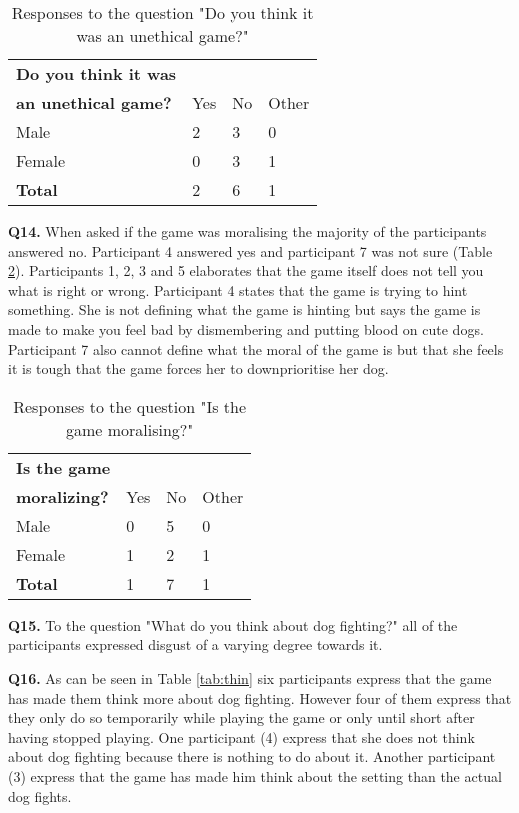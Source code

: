 \begin{table}[h]
\centering
\begin{tabular}{l l l l}
\hline
\textbf{Do you think it was}\\
\textbf{an unethical game?} & Yes & No & Other \\
\hline
Male & 2 & 3 & 0 \\
Female & 0 & 3 & 1 \\
\textbf{Total} & 2 & 6 & 1 \\
\hline
\end{tabular}
\caption{\label{tab:ethi}Responses to the question "Do you think it was an unethical game?"}
\end{table}


\textbf{Q14.} When asked if the game was moralising the majority of the participants answered no. Participant 4 answered yes and participant 7 was not sure (Table \ref{tab:mora}). Participants 1, 2, 3 and 5 elaborates that the game itself does not tell you what is right or wrong. Participant 4 states that the game is trying to hint something. She is not defining what the game is hinting but says the game is made to make you feel bad by dismembering and putting blood on cute dogs. Participant 7 also cannot define what the moral of the game is but that she feels it is tough that the game forces her to downprioritise her dog.

\begin{table}[h]
\centering
\begin{tabular}{l l l l}
\hline
\textbf{Is the game}\\
\textbf{moralizing?} & Yes & No & Other \\
\hline
Male & 0 & 5 & 0 \\
Female & 1 & 2 & 1 \\
\textbf{Total} & 1 & 7 & 1 \\
\hline
\end{tabular}
\caption{\label{tab:mora}Responses to the question "Is the game moralising?"}
\end{table}


\textbf{Q15.} To the question "What do you think about dog fighting?" all of the participants expressed disgust of a varying degree towards it. 


\textbf{Q16.} As can be seen in Table \ref{tab:thin} six participants express that the game has made them think more about dog fighting. However four of them express that they only do so temporarily while playing the game or only until short after having stopped playing. One participant (4) express that she does not think about dog fighting because there is nothing to do about it. Another participant (3) express that the game has made him think about the setting than the actual dog fights.


